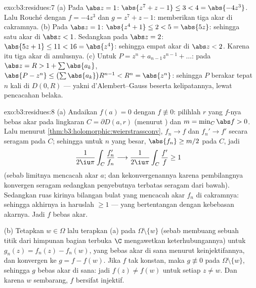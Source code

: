 \begin{solution}{exo:b3:residues:7}
(a) Pada $\abs z = 1$: $\abs{z^7 + z - 1} \leq 3 < 4 =
\abs{-4z^3}$. Lalu Rouché dengan $f = -4z^3$ dan $g = z^7 + z - 1$:
memberikan tiga akar di cakramnya.
(b) Pada $\abs z = 1$: $\abs{z^4 + 1} \leq 2 < 5 = \abs{5z}$:
sehingga satu akar di $\abs z < 1$. Sedangkan pada $\abs z = 2$: $\abs{5z + 1} \leq
11 < 16 = \abs{z^4}$: sehingga empat akar di $\abs z < 2$. Karena itu tiga
akar di anulusnya.
(c) Untuk $P = z^n + a_{n-1}z^{n-1} + \dots$: pada $\abs z = R >
1 + \sum\abs{a_k}$, $\abs{P - z^n} \leq
\bigl(\sum\abs{a_k}\bigr)R^{n-1} < R^n = \abs{z^n}$: sehingga $P$ berakar
tepat $n$ kali di $D(0, R)$ --- yakni d'Alembert--Gauss beserta
kelipatannya, lewat pencacahan belaka.
\end{solution}

\begin{solution}{exo:b3:residues:8}
(a) Andaikan $f(a) = 0$ dengan $f \not\equiv 0$: pilihlah $r$ yang $f$-nya
bebas akar pada lingkaran $C = \partial D(a, r)$ (menurut ) dan $m = \min_C\abs f > 0$. Lalu menurut
\cref{thm:b3:holomorphic:weierstrassconv}, $f_n \to f$ dan
$f_n' \to f'$ secara seragam pada $C$; sehingga untuk $n$ yang besar, $\abs{f_n}
\geq m/2$ pada $C$, jadi
\[
\frac1{2\iu\pi}\int_C\frac{f_n'}{f_n}
\longrightarrow \frac1{2\iu\pi}\int_C\frac{f'}{f} \geq 1
\]
(sebab limitnya mencacah akar $a$; dan kekonvergenannya karena
pembilangnya konvergen seragam sedangkan penyebutnya terbatas
seragam dari bawah). Sedangkan ruas kirinya bilangan bulat yang mencacah akar
$f_n$ di cakramnya: sehingga akhirnya ia haruslah $\geq 1$ ---
yang bertentangan dengan kebebasan akarnya. Jadi $f$ bebas akar.

(b) Tetapkan $w \in \Omega$ lalu terapkan (a) pada  
$\Omega\setminus\{w\}$ (sebab membuang sebuah titik dari himpunan bagian terbuka
 $\C$ mengawetkan keterhubungannya) untuk $g_n(z) = f_n(z) -
f_n(w)$, yang bebas akar di sana menurut keinjektifannya, dan konvergen ke $g = f
- f(w)$. Jika $f$ tak konstan, maka $g \not\equiv 0$ pada
$\Omega\setminus\{w\}$, sehingga $g$ bebas akar di sana: jadi $f(z) \neq
f(w)$ untuk setiap $z \neq w$. Dan karena $w$ sembarang, $f$ bersifat
injektif.
\end{solution}

